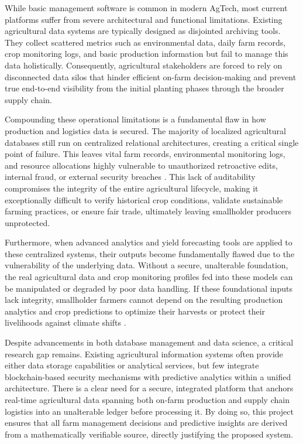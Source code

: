 While basic management software is common in modern AgTech, most current platforms suffer from severe architectural and functional limitations. Existing agricultural data systems are typically designed as disjointed archiving tools. They collect scattered metrics such as environmental data, daily farm records, crop monitoring logs, and basic production information but fail to manage this data holistically. Consequently, agricultural stakeholders are forced to rely on disconnected data silos that hinder efficient on-farm decision-making and prevent true end-to-end visibility from the initial planting phases through the broader supply chain.

Compounding these operational limitations is a fundamental flaw in how production and logistics data is secured. The majority of localized agricultural databases still run on centralized relational architectures, creating a critical single point of failure. This leaves vital farm records, environmental monitoring logs, and resource allocations highly vulnerable to unauthorized retroactive edits, internal fraud, or external security breaches \parencite{alabsi2023blockchain}. This lack of auditability compromises the integrity of the entire agricultural lifecycle, making it exceptionally difficult to verify historical crop conditions, validate sustainable farming practices, or ensure fair trade, ultimately leaving smallholder producers unprotected.

Furthermore, when advanced analytics and yield forecasting tools are applied to these centralized systems, their outputs become fundamentally flawed due to the vulnerability of the underlying data. Without a secure, unalterable foundation, the real agricultural data and crop monitoring profiles fed into these models can be manipulated or degraded by poor data handling. If these foundational inputs lack integrity, smallholder farmers cannot depend on the resulting production analytics and crop predictions to optimize their harvests or protect their livelihoods against climate shifts \parencite{layek2025secured}.

Despite advancements in both database management and data science, a critical research gap remains. Existing agricultural information systems often provide either data storage capabilities or analytical services, but few integrate blockchain-based security mechanisms with predictive analytics within a unified architecture. There is a clear need for a secure, integrated platform that anchors real-time agricultural data spanning both on-farm production and supply chain logistics into an unalterable ledger before processing it. By doing so, this project ensures that all farm management decisions and predictive insights are derived from a mathematically verifiable source, directly justifying the proposed system.

